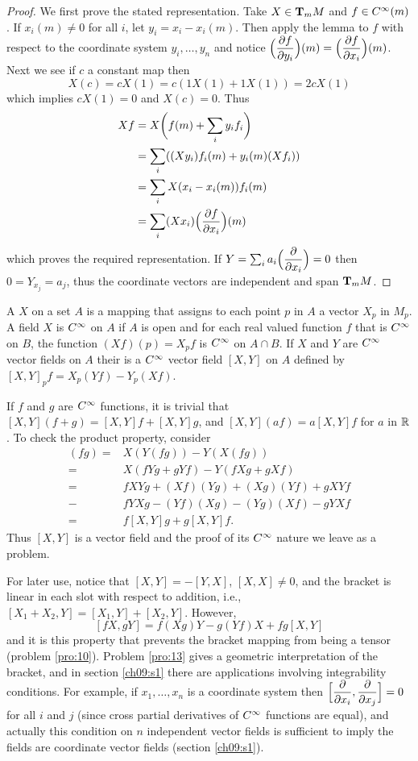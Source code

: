 \documentclass[../main]{subfiles}
\begin{document}
\begin{proof}
We first prove the stated representation. Take $X \in \tangentspace{M}{m}$ and $f \in \CInfty(m)$. If $x_i(m)\neq0$ for all $i$, let $y_i=x_i-x_i(m)$. Then apply the lemma to $f$ with respect to the coordinate system $y_i, \dots, y_n$ and notice $\Big(\pdv{f}{y_i}\Big)(m)=\Big(\pdv{f}{x_i}\Big)(m)$. Next we see if $c$ a constant map then \[X(c)=cX(1)=c(1X(1)+1X(1))=2cX(1)\] which implies $cX(1)=0$ and $X(c)=0$. Thus \begin{align*}
    Xf&=X\bigg(f(m)+\sum_i y_i f_i\bigg)\\
    &=\sum_i((Xy_i)f_i(m)+y_i(m)(Xf_i))\\
    &=\sum_iX(x_i-x_i(m))f_i(m)\\
    &=\sum_i(Xx_i)\Big(\pdv{f}{x_i}\Big)(m)
\end{align*}
which proves the required representation. If $Y=\sum_i a_i\Big(\pdv{}{x_i}\Big)=0$ then $0=Y_{x_j}=a_j$, thus the coordinate vectors are independent and span $\tangentspace{M}{m}$.
\end{proof}

A  $X$ on a set $A$ is a mapping that assigns to each point $p$ in $A$ a vector $X_p$ in $M_p$. A field $X$ is $\CInfty$ on $A$ if $A$ is open and for each real valued function $f$ that is $\CInfty$ on $B$, the function $(Xf)(p)=X_pf$ is $\CInfty$ on $A \cap B$. If $X$ and $Y$ are $\CInfty$ vector fields on $A$ their  is a $\CInfty$ vector field $[X, Y]$ on $A$ defined by $[X, Y]_pf=X_p(Yf)-Y_p(Xf)$.

If $f$ and $g$ are $\CInfty$ functions, it is trivial that $[X,Y](f+g)=[X, Y] f+[X, Y]g$, and $[X, Y](a f)=a[X, Y]f$ for $a$ in $\bR$. To check the product property, consider
\begin{align*}
[X, Y](f g)=&X(Y(f g))-Y(X(f g))\\
=& X(f Y g+g Y f)-Y(f X g+g X f) \\
=& f X Y g+(X f)(Y g)+(X g)(Y f)+g X Y f\\
-& f Y X g-(Y f)(X g)-(Y g)(X f)-g Y X f \\
=& f[X, Y] g+g[X, Y] f.
\end{align*}
Thus $[X, Y]$ is a vector field and the proof of its $\CInfty$ nature we leave as a problem.

For later use, notice that $[X, Y]=-[Y, X]$, $[X, X]\neq0$, and the bracket is linear in each slot with respect to addition, i.e., $[X_1+X_2,Y]=[X_1, Y]+[X_2, Y]$. However, \[[fX, g Y]=f(X g) Y-g(Y f) X+f g[X, Y]\] and it is this property that prevents the bracket mapping from being a tensor (problem \ref{pro:10}). Problem \ref{pro:13} gives a geometric interpretation of the bracket, and in section \ref{ch09:s1} there are applications involving integrability conditions. For example, if $x_1, \dots, x_n$ is a coordinate system then $\Big[\pdv{}{x_i},\pdv{}{x_j}\Big]=0$ for all $i$ and $j$ (since cross partial derivatives of $\CInfty$ functions are equal), and actually this condition on $n$ independent vector fields is sufficient to imply the fields are coordinate vector fields (section \ref{ch09:s1}).
\end{document}
